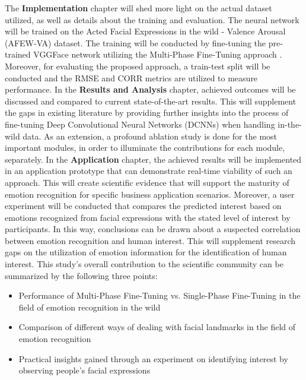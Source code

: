 \newline\newline
The \textbf{Implementation} chapter will shed more light on the actual dataset utilized, as well as details about the training and evaluation. The neural network will be trained on the Acted Facial Expressions in the wild - Valence Arousal (AFEW-VA) dataset. The training will be conducted by fine-tuning the pre-trained VGGFace network utilizing the Multi-Phase Fine-Tuning approach \citep{Sarhan:2020:MultiPhaseFineTuning}. Moreover, for evaluating the proposed approach, a train-test split will be conducted and the RMSE and CORR metrics are utilized to measure performance.
\newline\newline
In the \textbf{Results and Analysis} chapter, achieved outcomes will be discussed and compared to current state-of-the-art results. This will supplement the gaps in existing literature by providing further insights into the process of fine-tuning Deep Convolutional Neural Networks (DCNNs) when handling in-the-wild data. As an extension, a profound ablation study is done for the most important modules, in order to illuminate the contributions for each module, separately.
\newline\newline
In the \textbf{Application} chapter, the achieved results will be implemented in an application prototype that can demonstrate real-time viability of such an approach. This will create scientific evidence that will support the maturity of emotion recognition for specific business application scenarios. Moreover, a user experiment will be conducted that compares the predicted interest based on emotions recognized from facial expressions with the stated level of interest by participants. In this way, conclusions can be drawn about a suspected correlation between emotion recognition and human interest. This will supplement research gaps on the utilization of emotion information for the identification of human interest. 
\newline\newline
This study's overall contribution to the scientific community can be summarized by the following three points:
\begin{itemize}
    \item Performance of Multi-Phase Fine-Tuning vs. Single-Phase Fine-Tuning in the field of emotion recognition in the wild
    \item Comparison of different ways of dealing with facial landmarks in the field of emotion recognition
    \item Practical insights gained through an experiment on identifying interest by observing people's facial expressions
\end{itemize}